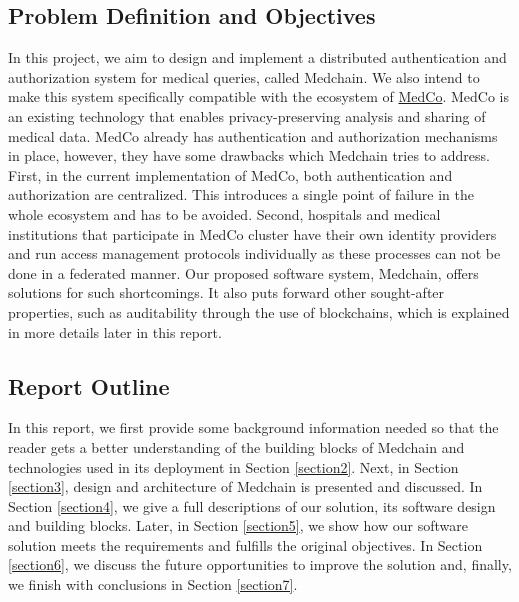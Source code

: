\subsection{Problem Definition and Objectives}

In this project, we aim to design and implement a distributed authentication and authorization system for medical queries, called Medchain. We also intend to make this system specifically compatible with the ecosystem of \href{https://medco.epfl.ch/}{MedCo}. MedCo is an existing technology that enables privacy-preserving analysis and sharing of medical data. MedCo already has authentication and authorization mechanisms in place, however, they have some drawbacks which Medchain tries to address. First, in the current implementation of MedCo, both authentication and authorization are centralized. This introduces a single point of failure in the whole ecosystem and has to be avoided. Second, hospitals and medical institutions that participate in MedCo cluster have their own identity providers and run access management protocols individually as these processes can not be done in a federated manner. Our proposed software system, Medchain, offers solutions for such shortcomings. It also puts forward other sought-after properties, such as auditability through the use of blockchains, which is explained in more details later in this report. 


\subsection{Report Outline}
In this report, we first provide some background information needed so that the reader gets a better understanding of the building blocks of Medchain and technologies used in its deployment in Section \ref{section2}. Next, in Section \ref{section3}, design and architecture of Medchain is presented and discussed. In Section \ref{section4}, we give a full descriptions of our solution, its software design and building blocks. Later, in Section \ref{section5}, we show how our software solution meets the requirements and fulfills the original objectives. In Section \ref{section6}, we discuss the future opportunities to improve the solution and, finally, we finish with conclusions in Section \ref{section7}.